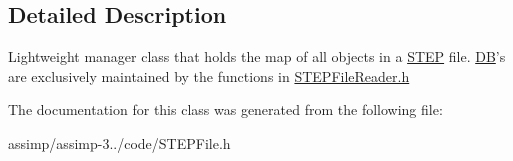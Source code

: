 \subsection{Detailed Description}
Lightweight manager class that holds the map of all objects in a \hyperlink{namespace_assimp_1_1_s_t_e_p}{S\+T\+E\+P} file. \hyperlink{class_assimp_1_1_s_t_e_p_1_1_d_b}{D\+B}'s are exclusively maintained by the functions in \hyperlink{_s_t_e_p_file_reader_8h_source}{S\+T\+E\+P\+File\+Reader.\+h} 

The documentation for this class was generated from the following file\+:\begin{DoxyCompactItemize}
\item 
assimp/assimp-\/3../code/S\+T\+E\+P\+File.\+h\end{DoxyCompactItemize}
